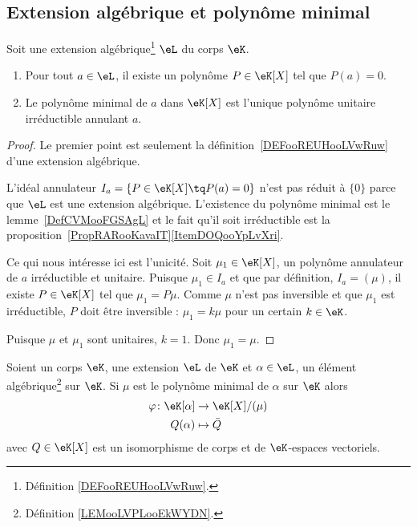 \subsection{Extension algébrique et polynôme minimal}

\begin{proposition}      \label{PROPooALFJooDjmIcb}
	Soit une extension algébrique\footnote{Définition \ref{DEFooREUHooLVwRuw}.} \( \eL\) du corps \( \eK\).
	\begin{enumerate}
		\item
		      Pour tout \( a\in \eL\), il existe un polynôme \( P\in \eK[X]\) tel que \( P(a)=0\).
		\item       \label{ITEMooEFNFooKYqXDk}
		      Le polynôme minimal de \( a\) dans \( \eK[X]\) est l'unique polynôme unitaire irréductible annulant \( a\).
	\end{enumerate}
\end{proposition}

\begin{proof}
	Le premier point est seulement la définition~\ref{DEFooREUHooLVwRuw} d'une extension algébrique.

	L'idéal annulateur \( I_a=\{ P\in \eK[X]\tq P(a)=0 \}\) n'est pas réduit à \( \{ 0 \}\) parce que \( \eL\) est une extension algébrique. L'existence du polynôme minimal est le lemme~\ref{DefCVMooFGSAgL} et le fait qu'il soit irréductible est la proposition~\ref{PropRARooKavaIT}\ref{ItemDOQooYpLvXri}.

	Ce qui nous intéresse ici est l'unicité. Soit \( \mu_1\in \eK[X]\), un polynôme annulateur de \( a\) irréductible et unitaire. Puisque \( \mu_1\in I_a\) et que par définition, \( I_a=(\mu)\), il existe \( P\in \eK[X]\) tel que \( \mu_1=P\mu\). Comme \( \mu\) n'est pas inversible et que \( \mu_1\) est irréductible, \( P\) doit être inversible : \( \mu_1=k\mu\) pour un certain \( k\in \eK\).

	Puisque \( \mu\) et \( \mu_1\) sont unitaires, \( k=1\). Donc \( \mu_1=\mu\).
\end{proof}

\begin{lemma}       \label{LEMooHKTMooKEoOuK}
	Soient un corps \( \eK\), une extension \( \eL\) de \( \eK\) et \( \alpha\in \eL\), un élément algébrique\footnote{Définition \ref{LEMooLVPLooEkWYDN}.} sur \( \eK\). Si \( \mu\) est le polynôme minimal de \( \alpha\) sur \( \eK\) alors
	\begin{equation}
		\begin{aligned}
			\varphi\colon \eK[\alpha] & \to \eK[X]/(\mu) \\
			Q(\alpha)                 & \mapsto \bar Q
		\end{aligned}
	\end{equation}
	avec \( Q\in\eK[X]\) est un isomorphisme de corps et de \( \eK\)-espaces vectoriels.
\end{lemma}

